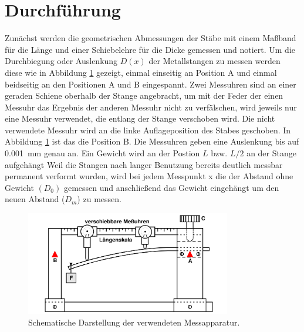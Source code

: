 \section{Durchführung}
Zunächst werden die geometrischen Abmessungen der Stäbe mit einem Maßband für die Länge und einer Schiebelehre für die Dicke
gemessen und notiert.
Um die Durchbiegung oder Auslenkung $D(x)$ der Metallstangen zu messen werden diese wie in Abbildung \ref{fig:Messapparatur} gezeigt,
einmal einseitig an Position A und einmal beidseitig an den Positionen A und B eingespannt.
Zwei Messuhren sind an einer geraden Schiene oberhalb der Stange angebracht, um mit der Feder der einen Messuhr das Ergebnis der
anderen Messuhr nicht zu verfälschen, wird jeweils nur eine Messuhr verwendet, die entlang der Stange verschoben wird.
Die nicht verwendete Messuhr wird an die linke Auflageposition des Stabes geschoben. In Abbildung \ref{fig:Messapparatur}
ist das die Position B.
Die Messuhren geben eine Auslenkung bis auf \qty{0.001}{\milli\meter} genau an.
Ein Gewicht wird an der Postion $L$ bzw. $L/2$ an der Stange aufgehängt
Weil die Stangen nach langer Benutzung bereits deutlich messbar permanent verformt wurden,
wird bei jedem Messpunkt x die der Abstand ohne Gewicht $(D_0)$ gemessen und anschließend das Gewicht eingehängt 
um den neuen Abstand ($D_m$) zu messen.

\begin{figure} 
    \centering
    \includegraphics[width=0.8\textwidth]{Abbildungen/Messapperatur.png}
    \caption{Schematische Darstellung der verwendeten Messapparatur\cite{man:v103}.}
    \label{fig:Messapparatur}
\end{figure}
